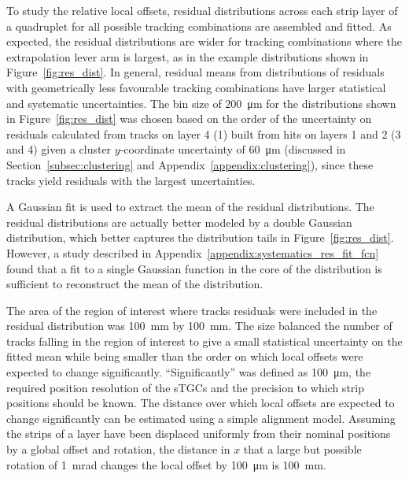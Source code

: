 To study the relative local offsets, residual distributions across each strip layer of a quadruplet for all possible tracking combinations are assembled and fitted. As expected, the residual distributions are wider for tracking combinations where the extrapolation lever arm is largest, as in the example distributions shown in Figure~\ref{fig:res_dist}. In general, residual means from distributions of residuals with geometrically less favourable tracking combinations have larger statistical and systematic uncertainties. The bin size of \SI{200}{\micro\meter} for the distributions shown in Figure~\ref{fig:res_dist} was chosen based on the order of the uncertainty on residuals calculated from tracks on layer 4 (1) built from hits on layers 1 and 2 (3 and 4) given a cluster $y$-coordinate uncertainty of \SI{60}{\micro\meter} (discussed in Section~\ref{subsec:clustering} and Appendix~\ref{appendix:clustering}), since these tracks yield residuals with the largest uncertainties.

A Gaussian fit is used to extract the mean of the residual distributions. The residual distributions are actually better modeled by a double Gaussian distribution, which better captures the distribution tails in Figure~\ref{fig:res_dist}. However, a study described in Appendix~\ref{appendix:systematics_res_fit_fcn} found that a fit to a single Gaussian function in the core of the distribution is sufficient to reconstruct the mean of the distribution.

The area of the region of interest where tracks residuals were included in the residual distribution was \SI{100}{\milli\meter} by \SI{100}{\milli\meter}. The size balanced the number of tracks falling in the region of interest to give a small statistical uncertainty on the fitted mean while being smaller than the order on which local offsets were expected to change significantly. ``Significantly'' was defined as \SI{100}{\micro\meter}, the required position resolution of the sTGCs and the precision to which strip positions should be known. The distance over which local offsets are expected to change significantly can be estimated using a simple alignment model. Assuming the strips of a layer have been displaced uniformly from their nominal positions by a global offset and rotation, the distance in $x$ that a large but possible rotation of \SI{1}{mrad} changes the local offset by \SI{100}{\micro\meter} is \SI{100}{mm}.

